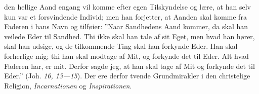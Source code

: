 \documentclass[12pt]{book}
\newcommand{\opage}[1]{\marginnote{\footnotesize\textit{[#1]}}}
\begin{document}
den hellige Aand engang vil komme efter egen Tilskyndelse og lære, at han selv
kun var et forsvindende Individ; men han forjetter, at Aanden skal komme fra
Faderen i hans Navn og tilføier: ”Naar Sandhedens Aand kommer, da skal han
veilede Eder til Sandhed. Thi ikke skal han tale af sit Eget, men hvad han hører,
skal han udsige, og de tilkommende Ting skal han forkynde Eder. Han skal
forherlige mig; thi han skal modtage af Mit, og forkynde det til Eder. Alt hvad
Faderen har, er mit. Derfor sagde jeg, at han skal tage af Mit og
\opage{154} forkynde det til Eder.” (Joh. \textit{16, 13---15}). Der ere derfor tvende
Grundmirakler i den christelige Religion, \emph{Incarnationen} og
\emph{Inspirationen}.
\end{document}
